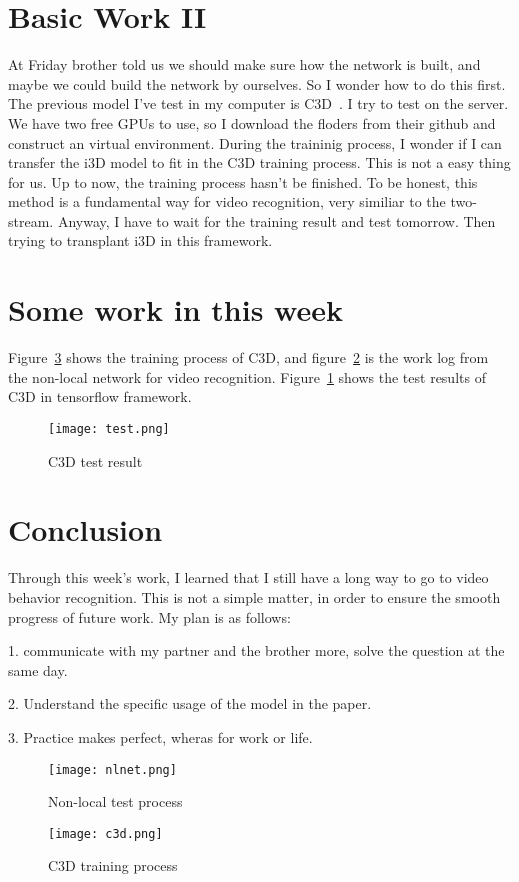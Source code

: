 \documentclass[10pt,letterpaper]{article}
\begin{document}
\section{Basic Work II}
At Friday brother told us we should make sure how the network is built, and maybe we could build the network by ourselves. So I wonder how to do this first. The previous model I've test in my computer is C3D~\cite{name3}. I try to test on the server. We have two free GPUs to use, so I download the floders from their github and construct an virtual environment. During the traininig process, I wonder if I can transfer the i3D model to fit in the C3D training process. This is not a easy thing for us. Up to now, the training process hasn't be finished. To be honest, this method is a fundamental way for video recognition, very similiar to the two-stream. Anyway, I have to wait for the training result and test tomorrow. Then trying to transplant i3D in this framework. 
\section{Some work in this week}
Figure~\ref{fv} shows the training process of C3D, and figure~\ref{fx} is the work log from the non-local network for video recognition. Figure~\ref{fy} shows the test results of C3D in tensorflow framework.
  \begin{figure}[!htb]
  	\centering
  	\texttt{[image: test.png]}\\
  	\caption{C3D test result}\label{fy}
  \end{figure}
\section{Conclusion}
Through this week's work, I learned that I still have a long way to go to video behavior recognition. This is not a simple matter, in order to ensure the smooth progress of future work. My plan is as follows:
\par 1. communicate with my partner and the brother more, solve the question at the same day.
\par 2. Understand the specific usage of the model in the paper.
\par 3. Practice makes perfect, wheras for work or life.
 \begin{figure}[!htb]
 	\centering
 	\texttt{[image: nlnet.png]}\\
 	\caption{Non-local test process}\label{fx}
 \end{figure}
  \begin{figure}[!htb]
  	\centering
  	\texttt{[image: c3d.png]}\\
  	\caption{C3D training process}\label{fv}
  \end{figure}


\end{document}
